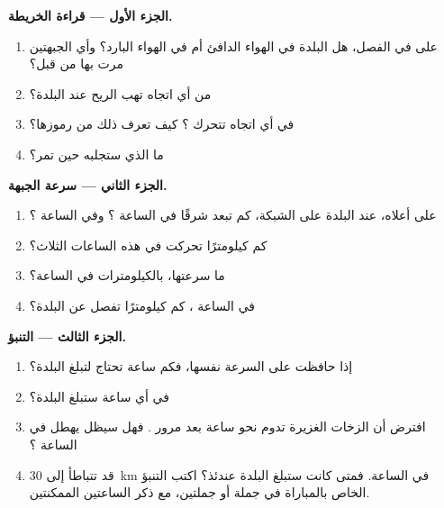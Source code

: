 \begin{problem}
\noindent\textbf{الجزء الأول --- قراءة الخريطة.}\par\nopagebreak
\begin{enumerate}[beginpenalty=10000]
  \item على   في الفصل، هل البلدة في الهواء الدافئ أم
        في الهواء البارد؟ وأي الجبهتين مرت بها من قبل؟
  \item من أي اتجاه تهب الريح عند البلدة؟
  \item في أي اتجاه تتحرك ؟ كيف تعرف ذلك من
        رموزها؟
  \item ما  الذي ستجلبه  حين تمر؟
\end{enumerate}

\noindent\textbf{الجزء الثاني --- سرعة الجبهة.}\par\nopagebreak
\begin{enumerate}[resume, beginpenalty=10000]
  \item على  أعلاه، عند  البلدة على الشبكة، كم تبعد  شرقًا
        في الساعة ؟ وفي الساعة ؟
  \item كم كيلومترًا تحركت  في هذه الساعات الثلاث؟
  \item ما سرعتها، بالكيلومترات في الساعة؟
  \item في الساعة ، كم كيلومترًا تفصل  عن البلدة؟
\end{enumerate}

\noindent\textbf{الجزء الثالث --- التنبؤ.}\par\nopagebreak
\begin{enumerate}[resume, beginpenalty=10000]
  \item إذا حافظت  على السرعة نفسها، فكم ساعة تحتاج لتبلغ
        البلدة؟
  \item في أي ساعة ستبلغ البلدة؟
  \item افترض أن الزخات الغزيرة تدوم نحو ساعة بعد مرور
        . فهل سيظل  يهطل في الساعة ؟
  \item قد تتباطأ  إلى \qty{30}{km} في الساعة. فمتى كانت
        ستبلغ البلدة عندئذ؟ اكتب التنبؤ الخاص بالمباراة في جملة أو
        جملتين، مع ذكر الساعتين الممكنتين.
\end{enumerate}
\end{problem}
